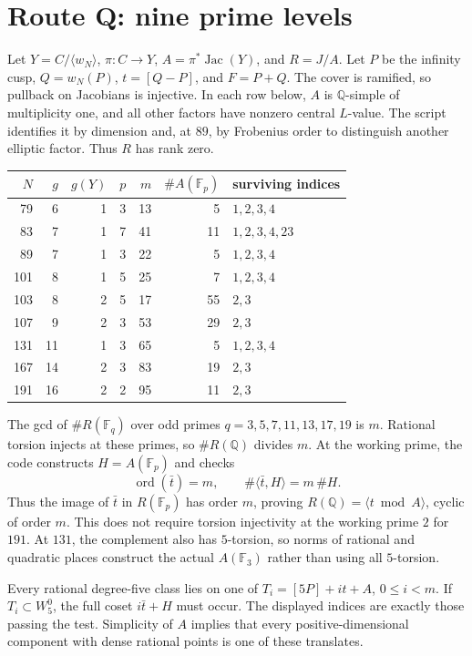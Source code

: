 \documentclass[11pt,a4paper]{article}
\newcommand{\Q}{\mathbb Q}
\newcommand{\F}{\mathbb F}
\newcommand{\Jac}{\operatorname{Jac}}
\newcommand{\W}{W^0_5}
\begin{document}
\section{Route Q: nine prime levels}\label{sec:quotient}
Let $Y=C/\langle w_N\rangle$, $\pi:C\to Y$,
$A=\pi^*\Jac(Y)$, and $R=J/A$.
Let $P$ be the infinity cusp, $Q=w_N(P)$, $t=[Q-P]$, and $F=P+Q$.
The cover is ramified, so pullback on Jacobians is injective.
In each row below, $A$ is $\Q$-simple of multiplicity one, and all
other factors have nonzero central $L$-value. The script identifies it
by dimension and, at $89$, by Frobenius order to distinguish another
elliptic factor. Thus $R$ has rank zero.
\begin{center}\small
\begin{tabular}{@{}rrrrrrl@{}}
\toprule $N$&$g$&$g(Y)$&$p$&$m$&$\#A(\F_p)$&surviving indices\\
\midrule
79&6&1&3&13&5&$1,2,3,4$\\
83&7&1&7&41&11&$1,2,3,4,23$\\
89&7&1&3&22&5&$1,2,3,4$\\
101&8&1&5&25&7&$1,2,3,4$\\
103&8&2&5&17&55&$2,3$\\
107&9&2&3&53&29&$2,3$\\
131&11&1&3&65&5&$1,2,3,4$\\
167&14&2&3&83&19&$2,3$\\
191&16&2&2&95&11&$2,3$\\
\bottomrule
\end{tabular}
\end{center}
The gcd of $\#R(\F_q)$ over odd primes $q=3,5,7,11,13,17,19$
is $m$. Rational torsion injects at these primes, so $\#R(\Q)$ divides $m$.
At the working prime, the code constructs $H=A(\F_p)$ and checks
\[
           \operatorname{ord}(\bar t)=m,\qquad
           \#\langle\bar t,H\rangle=m\,\#H.
\]
Thus the image of $\bar t$ in $R(\F_p)$ has order $m$, proving
$R(\Q)=\langle t\bmod A\rangle$, cyclic of order $m$.
This does not require torsion injectivity at the working prime $2$
for $191$. At $131$, the complement also has $5$-torsion, so norms of
rational and quadratic places construct the actual $A(\F_3)$ rather
than using all $5$-torsion.

Every rational degree-five class lies on one of
$T_i=[5P]+it+A$, $0\le i<m$.
If $T_i\subset\W$, the full coset $i\bar t+H$ must occur.
The displayed indices are exactly those passing the test.
Simplicity of $A$ implies that every positive-dimensional component with
dense rational points is one of these translates.
\end{document}
